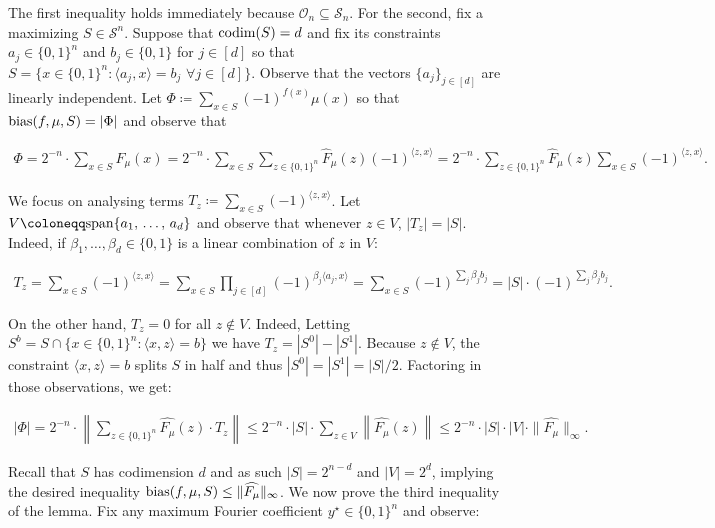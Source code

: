 The first inequality holds immediately because $\mathcal{O}_{n}\subseteq\mathcal{S}_{n}$. For the second, fix a maximizing $S\in\mathcal{S}^{n}$. Suppose that $\textup{codim}(S)=d$ and fix its constraints $a_{j}\in\{0,1\}^{n}$ and $b_{j}\in\{0,1\}$ for $j\in[d]$ so that $S=\{x\in\{0,1\}^{n}:\langle a_{j},x\rangle=b_{j}\,\,\forall j\in[d]\}$. Observe that the vectors $\{a_{j}\}_{j\in[d]}$ are linearly independent. Let $\Phi\coloneqq\sum\nolimits_{x\in S}(-1)^{f(x)}\mu(x)$ so that ${\textup{bias}}(f,\mu,S)=|\Phi|$ and observe that\par


\[\begin{gathered}
\Phi=2^{-n}\cdot\sum_{x\in S}F_{\mu}(x)=2^{-n}\cdot\sum_{x\in S}\sum_{z\in\{0,1\}^{n}}\widehat{F}_{\mu}(z)(-1)^{\langle z,x\rangle}=2^{-n}\cdot\sum_{z\in\{0,1\}^{n}}\widehat{F}_{\mu}(z)\sum_{x\in S}(-1)^{\langle z,x\rangle}.
\end{gathered}\]


We focus on analysing terms $T_{z}\coloneqq\sum_{x\in S}(-1)^{\langle z,x\rangle}$. Let $V\coloneqq\textup{span}\{a_{1},\,\dots,\,a_{d}\}$ and observe that whenever $z\in V$, $|T_{z}|=|S|$. Indeed, if $\beta_{1},\dots,\beta_{d}\in\{0,1\}$ is a linear combination of $z$ in $V$:\par


\[\begin{gathered}
T_{z}=\sum_{x\in S}(-1)^{\langle z,x\rangle}=\sum_{x\in S}\prod_{j\in[d]}(-1)^{\beta_{j}\langle a_{j},x\rangle}=\sum_{x\in S}(-1)^{\sum_{j}\beta_{j}b_{j}}=|S|\cdot(-1)^{\sum_{j}\beta_{j}b_{j}}.
\end{gathered}\]


On the other hand, $T_{z}=0$ for all $z\notin V$. Indeed, Letting $S^{b}=S\cap\{x\in\{0,1\}^{n}:\langle x,z\rangle=b\}$ we have $T_{z}=|S^{0}|-|S^{1}|$. Because $z\notin V$, the constraint $\langle x,z\rangle=b$ splits $S$ in half and thus $|S^{0}|=|S^{1}|=|S|/2$. Factoring in those observations, we get:\par


\[\begin{gathered}
|\Phi|=2^{-n}\cdot\left\|\sum_{z\in\{0,1\}^{n}}\widehat{F_{\mu}}(z)\cdot T_{z}\right\|\leq 2^{-n}\cdot|S|\cdot\sum_{z\in V}\left\|\widehat{F_{\mu}}(z)\right\|\leq 2^{-n}\cdot|S|\cdot|V|\cdot\|\widehat{F_{\mu}}\|_{\infty}.
\end{gathered}\]


Recall that $S$ has codimension $d$ and as such $|S|=2^{n-d}$ and $|V|=2^{d}$, implying the desired inequality ${\textup{bias}}(f,\mu,S)\leq\|\widehat{F_{\mu}}\|_{\infty}$. We now prove the third inequality of the lemma. Fix any maximum Fourier coefficient $y^{\star}\in\{0,1\}^{n}$ and observe:\par


